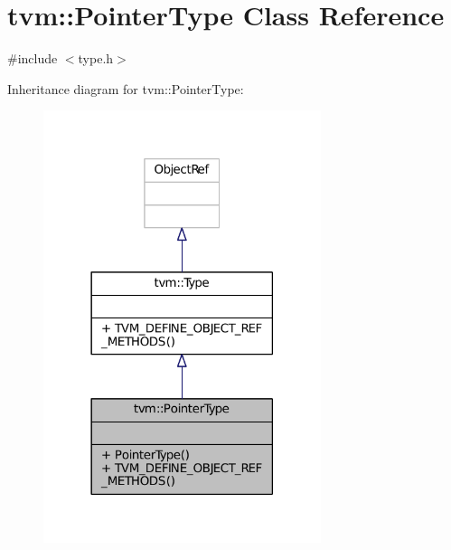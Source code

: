 \hypertarget{classtvm_1_1PointerType}{}\section{tvm\+:\+:Pointer\+Type Class Reference}
\label{classtvm_1_1PointerType}


{\ttfamily \#include $<$type.\+h$>$}



Inheritance diagram for tvm\+:\+:Pointer\+Type\+:
\nopagebreak
\begin{figure}[H]
\begin{center}
\leavevmode
\includegraphics[width=230pt]{classtvm_1_1PointerType__inherit__graph}
\end{center}
\end{figure}


